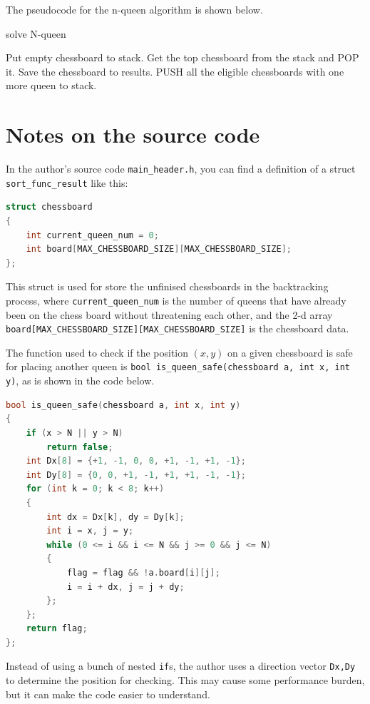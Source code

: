 \documentclass[cn,black,12pt,normal]{elegantnote}
\begin{document}
The pseudocode for the n-queen algorithm is shown below.
\begin{algorithm}[H]
    \caption{solve N-queen}
    \label{alg2}
    \begin{algorithmic}
        \STATE Put empty chessboard to stack.
        \STATE Get the top chessboard from the stack and POP it.
        \STATE Save the chessboard to results.
        \ELSE
        \STATE PUSH all the eligible chessboards with one more queen to stack.
        \ENDIF
        \ENDWHILE
    \end{algorithmic}
\end{algorithm}

\section{Notes on the source code}

In the author's source code \lstinline{main_header.h}, you can find a definition of a struct \lstinline{sort_func_result} like this:
\begin{lstlisting}[language = C++]
struct chessboard
{
	int current_queen_num = 0;
	int board[MAX_CHESSBOARD_SIZE][MAX_CHESSBOARD_SIZE];
};
\end{lstlisting}
This struct is used for store the unfinised chessboards in the backtracking process, where \lstinline{current_queen_num} is the number of queens that have already been on the chess board without threatening each other, and the 2-d array \lstinline{board[MAX_CHESSBOARD_SIZE][MAX_CHESSBOARD_SIZE]} is the chessboard data.

The function used to check if the position $(x,y)$ on a given chessboard is safe for placing another queen is \lstinline{bool is_queen_safe(chessboard a, int x, int y)}, as is shown in the code below.
\begin{lstlisting}[language = C++]
bool is_queen_safe(chessboard a, int x, int y)
{
	if (x > N || y > N)
		return false;
	int Dx[8] = {+1, -1, 0, 0, +1, -1, +1, -1};
	int Dy[8] = {0, 0, +1, -1, +1, +1, -1, -1};
	for (int k = 0; k < 8; k++)
	{
		int dx = Dx[k], dy = Dy[k];
		int i = x, j = y;
		while (0 <= i && i <= N && j >= 0 && j <= N)
		{
			flag = flag && !a.board[i][j];
			i = i + dx, j = j + dy;
		};
	};
	return flag;
};
\end{lstlisting}

Instead of using a bunch of nested \lstinline{if}s, the author uses a direction vector \lstinline{Dx,Dy} to determine the position for checking. This may cause some performance burden, but it can make the code easier to understand.
\end{document}
